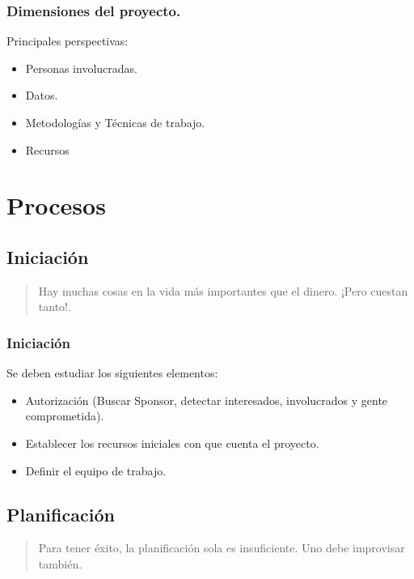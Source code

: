 \documentclass[12pt]{beamer}
\begin{document}
\begin{frame}
\frametitle{Dimensiones del proyecto.}
Principales perspectivas:
\begin{itemize}
 \item<2-> Personas involucradas.
 \item<3-> Datos.
 \item<4-> Metodologías y Técnicas de trabajo.
 \item<5-> Recursos
\end{itemize}
\end{frame}




\section{Procesos}
\subsection{Iniciación}


\begin{frame}
 \begin{quote}
  Hay muchas cosas en la vida más importantes que el dinero. ¡Pero cuestan tanto!.
 \newline
 \newline
 \end{quote}
\end{frame}




\begin{frame}
 \frametitle{Iniciación}
 Se deben estudiar los siguientes elementos:
 \begin{itemize}
  \item<2-> Autorización (Buscar Sponsor, detectar interesados, involucrados y gente comprometida).
  \item<3-> Establecer los recursos iniciales con que cuenta el proyecto.
  \item<4-> Definir el equipo de trabajo.
 \end{itemize}
\end{frame}


\subsection{Planificación}

\begin{frame}
 \begin{quote}
 Para tener éxito, la planificación sola es insuficiente. Uno debe improvisar también.
 \newline
 \newline
 \end{quote}
\end{frame}
\end{document}
